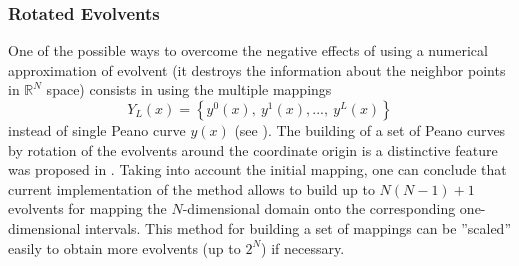\documentclass{svproc}
\begin{document}
\subsubsection{Rotated Evolvents}
One of the possible ways to overcome the negative effects of using a numerical
approximation of evolvent (it destroys the information about the neighbor points in
$\mathbb{R}^N$ space)
consists in using the multiple mappings
\begin{equation}
  Y_L(x)=\left\{y^0(x),\ y^1(x),...,\ y^L(x)\right\}
\end{equation}
instead of single Peano curve $y(x)$ (see \cite{strSergGO}).
The building of a set of Peano curves by rotation of the evolvents around the coordinate origin is a
distinctive feature was proposed in \cite{Gergel2009}. Taking into account the initial mapping, one
can conclude that current implementation of the
method allows to build up to $N(N-1)+1$ evolvents for mapping the $N$-dimensional domain
onto the corresponding one-dimensional intervals. This method for building a set of mappings can be
''scaled'' easily to obtain more evolvents (up to
$2^N$) if necessary.
\end{document}
